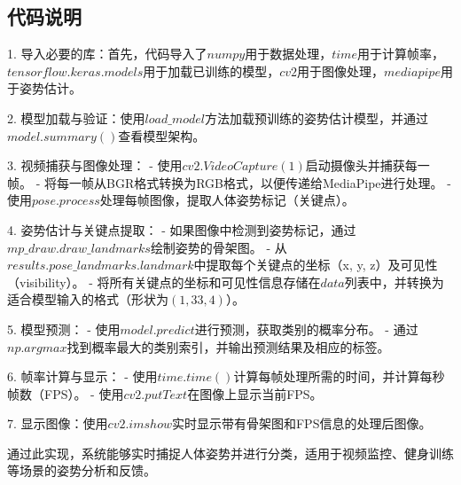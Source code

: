 \subsection{代码说明}

1. 导入必要的库：首先，代码导入了$numpy$用于数据处理，$time$用于计算帧率，$tensorflow.keras.models$用于加载已训练的模型，$cv2$用于图像处理，$mediapipe$用于姿势估计。

2. 模型加载与验证：使用$load\_model$方法加载预训练的姿势估计模型，并通过$model.summary()$查看模型架构。

3. 视频捕获与图像处理：
   - 使用$cv2.VideoCapture(1)$启动摄像头并捕获每一帧。
   - 将每一帧从BGR格式转换为RGB格式，以便传递给MediaPipe进行处理。
   - 使用$pose.process$处理每帧图像，提取人体姿势标记（关键点）。

4. 姿势估计与关键点提取：
   - 如果图像中检测到姿势标记，通过$mp\_draw.draw\_landmarks$绘制姿势的骨架图。
   - 从$results.pose\_landmarks.landmark$中提取每个关键点的坐标（x, y, z）及可见性（visibility）。
   - 将所有关键点的坐标和可见性信息存储在$data$列表中，并转换为适合模型输入的格式（形状为$(1, 33, 4)$）。

5. 模型预测：
   - 使用$model.predict$进行预测，获取类别的概率分布。
   - 通过$np.argmax$找到概率最大的类别索引，并输出预测结果及相应的标签。

6. 帧率计算与显示：
   - 使用$time.time()$计算每帧处理所需的时间，并计算每秒帧数（FPS）。
   - 使用$cv2.putText$在图像上显示当前FPS。

7. 显示图像：使用$cv2.imshow$实时显示带有骨架图和FPS信息的处理后图像。

通过此实现，系统能够实时捕捉人体姿势并进行分类，适用于视频监控、健身训练等场景的姿势分析和反馈。
